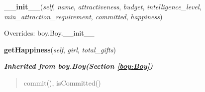     \vspace{0.5ex}

\hspace{.8\funcindent}\begin{boxedminipage}{\funcwidth}

    \raggedright \textbf{\_\_init\_\_}(\textit{self}, \textit{name}, \textit{attractiveness}, \textit{budget}, \textit{intelligence\_level}, \textit{min\_attraction\_requirement}, \textit{committed}, \textit{happiness})

\setlength{\parskip}{2ex}
\setlength{\parskip}{1ex}
      Overrides: boy.Boy.\_\_init\_\_

    \end{boxedminipage}

    \label{boy:Generous:getHappiness}

    \vspace{0.5ex}

\hspace{.8\funcindent}\begin{boxedminipage}{\funcwidth}

    \raggedright \textbf{getHappiness}(\textit{self}, \textit{girl}, \textit{total\_gifts})

\setlength{\parskip}{2ex}
\setlength{\parskip}{1ex}
    \end{boxedminipage}


\large{\textbf{\textit{Inherited from boy.Boy\textit{(Section \ref{boy:Boy})}}}}

\begin{quote}
commit(), isCommitted()
\end{quote}
